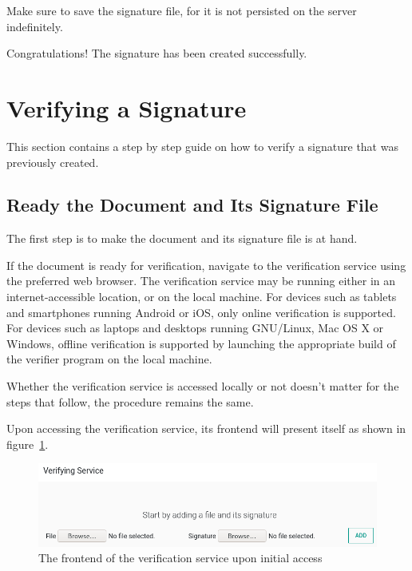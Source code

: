 Make sure to save the signature file,
for it is not persisted on the server indefinitely.

Congratulations!
The signature has been created successfully.





\section{Verifying a Signature}\label{sec:verifying-a-signature}
This section contains a step by step guide on how to verify a signature that was previously created.

\subsection{Ready the Document and Its Signature File}\label{subsec:ready-the-document-and-its-signature-file}
The first step is to make the document and its signature file is at hand.

If the document is ready for verification, navigate to the verification service using the preferred web browser.
The verification service may be running either in an internet-accessible location,
or on the local machine.
For devices such as tablets and smartphones running Android or iOS,
only online verification is supported.
For devices such as laptops and desktops running GNU/Linux, Mac OS X or Windows,
offline verification is supported by launching the appropriate build of the verifier program on the local machine.

Whether the verification service is accessed locally or not doesn't matter for the steps that follow,
the procedure remains the same.

Upon accessing the verification service, its frontend will present itself as shown in figure~\ref{fig:verify0}.
\begin{figure}[H]
    \begin{center}
        \includegraphics[width=\linewidth]{images/userguide_verify_0.png}
    \end{center}
    \caption{The frontend of the verification service upon initial access}
    \label{fig:verify0}
\end{figure}

